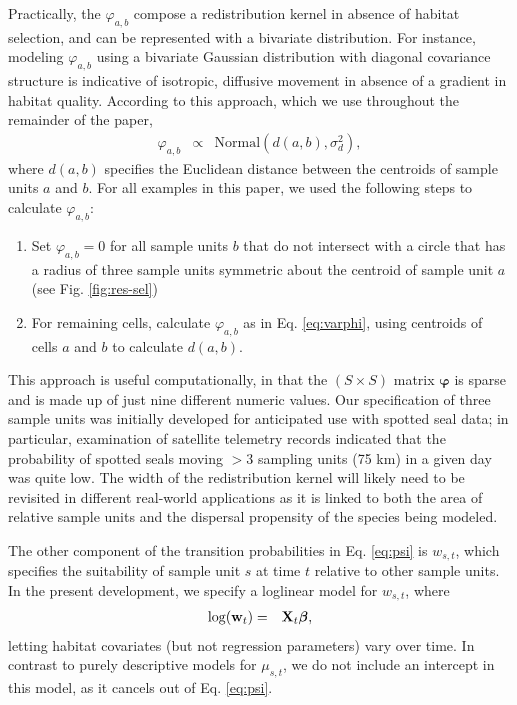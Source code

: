 \documentclass[12pt,english]{article}
\begin{document}
\begin{spacing}{1.9}
Practically, the $\varphi_{a,b}$ compose a redistribution kernel in absence of habitat selection, and can be represented with a bivariate distribution.  For instance, modeling $\varphi_{a,b}$ using a bivariate Gaussian distribution with diagonal covariance structure is indicative of isotropic, diffusive movement in absence of a gradient in habitat quality.  According to this approach, which we use throughout the remainder of the paper,
\begin{eqnarray}
  \varphi_{a,b} & \propto & \text{Normal}(d(a,b),\sigma_d^2), \label{eq:varphi}
\end{eqnarray}
where $d(a,b)$ specifies the Euclidean distance between the centroids of sample units $a$ and $b$. For all examples in this paper, we used the following steps to calculate $\varphi_{a,b}$:
\begin{enumerate}
  \item Set $\varphi_{a,b}=0$ for all sample units $b$ that do not intersect with a circle that has a radius of three sample units symmetric about the centroid of sample unit $a$ (see Fig. \ref{fig:res-sel})
  \item For remaining cells, calculate $\varphi_{a,b}$ as in Eq. \ref{eq:varphi}, using centroids of cells $a$ and $b$ to calculate $d(a,b)$.
\end{enumerate}
This approach is useful computationally, in that the $(S \times S)$ matrix $\boldsymbol{\varphi}$ is sparse and is made up of just nine different numeric values. Our specification of three sample units was initially developed for anticipated use with spotted seal data; in particular, examination of satellite telemetry records indicated that the probability of spotted seals moving $>3$ sampling units (75 km) in a given day was quite low.  The width of the redistribution kernel will likely need to be revisited in different real-world applications as it is linked to both the area of relative sample units and the dispersal propensity of the species being modeled.

The other component of the transition probabilities in Eq. \ref{eq:psi} is $w_{s,t}$, which specifies the suitability of sample unit $s$ at time $t$ relative to other sample units.  In the present development, we specify a loglinear model for $w_{s,t}$, where
\begin{eqnarray*}
  \log({\bf w}_t) & = & {\bf X}_t \boldsymbol{\beta}, %
\end{eqnarray*}
letting habitat covariates (but not regression parameters) vary over time.  In contrast to purely descriptive models for $\mu_{s,t}$, we do not include an intercept in this model, as it cancels out of Eq. \ref{eq:psi}.


\end{spacing}
\end{document}
